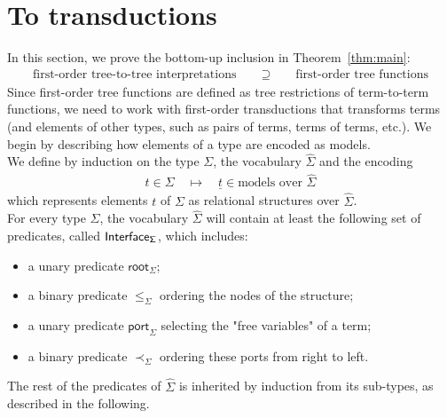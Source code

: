 \newcommand{\Root}[1]{\mathsf{root}_{#1}}
\newcommand{\Port}[1]{\mathsf{port}_{#1}}
\newcommand{\Interface}[1]{\mathsf{Interface}_{#1}}
\section{To transductions}
\label{sec:to-transductions}
In this section, we prove the bottom-up inclusion in Theorem~\ref{thm:main}:
\begin{align*}
    \text{first-order tree-to-tree interpretations} \qquad \supseteq \qquad \text{first-order tree functions}
\end{align*}
Since first-order tree functions are defined as tree restrictions of term-to-term functions, we need to work with first-order transductions that transforms terms (and elements of other types, such as pairs of terms, terms of terms, etc.). We begin by describing how elements of a type are encoded as models. 
\\

We define by induction on the type $\Sigma$, the vocabulary $\hat \Sigma$ and the encoding 
 \begin{align*}
     t \in \Sigma \quad \mapsto \quad \underline t \in \text{models over $\hat \Sigma$}
 \end{align*}
 which represents elements $t$ of $\Sigma$ as relational structures over $\hat \Sigma$.
 \\
 
 For every type $\Sigma$, the vocabulary $\hat \Sigma$ will contain at least the following set of predicates, called $\sf{Interface}_\Sigma$, which includes:
 \begin{itemize}
 \item a unary predicate $\Root{\Sigma}$;
 \item a binary predicate $\leq_\Sigma$ ordering the nodes of the structure;
  \item a unary predicate $\Port{\Sigma}$ selecting the "free variables" of a term; 
 \item a binary predicate $\prec_\Sigma$ ordering these ports from right to left.  
\end{itemize}  

The rest of the predicates of $\hat \Sigma$ is inherited by induction from its sub-types, as described in the following.\\

